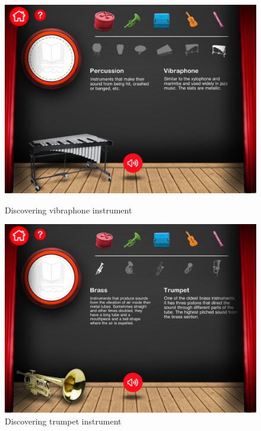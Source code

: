 \begin{figure}[ht!]
  \centering
  \includegraphics[width=350pt]{graphics/additional-screens/discovering_perc_vibraphone_screen.jpg}
  \vspace{0.05cm}
  \caption{Discovering vibraphone instrument}
  \vspace{0.6cm}

  \includegraphics[width=350pt]{graphics/additional-screens/discovering_brass_trumpet_screen.jpg}
  \vspace{0.05cm}
  \caption{Discovering trumpet instrument}
\end{figure}

